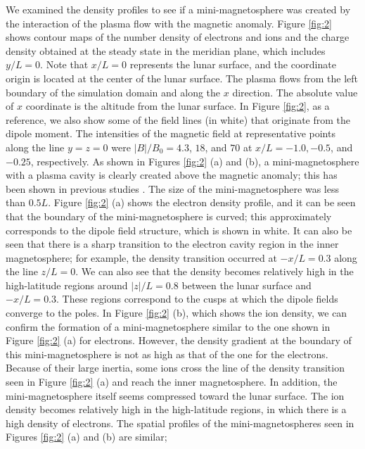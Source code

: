 \documentclass[draft,jgrga]{agutex2015}
\begin{document}
\begin{article}
We examined the density profiles to see 
if a mini-magnetosphere was created by the interaction of
the plasma flow with the magnetic anomaly.
Figure \ref{fig:2} shows contour maps of the number density of electrons and ions  
and the charge density obtained at the steady state 
in the meridian plane, which includes $y/L = 0$. 
Note that $x/L=0$ represents the lunar surface, and 
the coordinate origin is located at the center of the lunar surface.
The plasma flows from the left boundary of 
the simulation domain and along the $x$ direction. 
The absolute value of $x$ coordinate is the altitude from the lunar surface.
In Figure \ref{fig:2}, as a reference,
we also show some of the field lines (in white) that originate from the dipole moment.
The intensities of the magnetic field at representative points along the line $y=z=0$
were $|B|/B_{\mathrm{0}} = 4.3$, $18$, and $70$ at $x/L=-1.0, -0.5$, and $-0.25$, respectively.
As shown in Figures \ref{fig:2} (a) and (b), 
a mini-magnetosphere with a plasma cavity is clearly 
created above the magnetic anomaly; this has been shown in 
previous studies
\citep[e.g.,][]{Harnett2000,Harnett2003,Halekas2008b,Bamford2012}.
The size of the mini-magnetosphere was less than $0.5L$.
Figure \ref{fig:2} (a) shows the electron density profile, and it can be seen that the boundary of the mini-magnetosphere is curved; this approximately corresponds to the dipole field structure, which is
shown in white.
It can also be seen that there is a sharp transition to 
the electron cavity region in the inner magnetosphere; for example,
the density transition occurred at $-x/L = 0.3$ 
along the line $z/L =0$.
We can also see that the density becomes relatively high 
in the high-latitude regions around
$|z|/L=0.8$ between the lunar surface and $-x/L=0.3$.
These regions correspond to the cusps at which the dipole fields converge to the poles.
In Figure \ref{fig:2} (b), which shows the ion density, 
we can confirm the formation of a mini-magnetosphere similar to the one shown 
in Figure \ref{fig:2} (a) for electrons.
However, 
the density gradient at the boundary of this mini-magnetosphere is 
not as high as that of the one for the electrons.
Because of their large inertia, some ions cross the line of the density transition seen in Figure \ref{fig:2} (a) and 
reach the inner magnetosphere. 
In addition, the mini-magnetosphere itself seems compressed toward the lunar surface.
The ion density becomes relatively high in the high-latitude regions, in which there is a 
high density of electrons. 
The spatial profiles of the mini-magnetospheres seen in Figures \ref{fig:2} (a) and (b) are similar;

\end{article}
\end{document}
